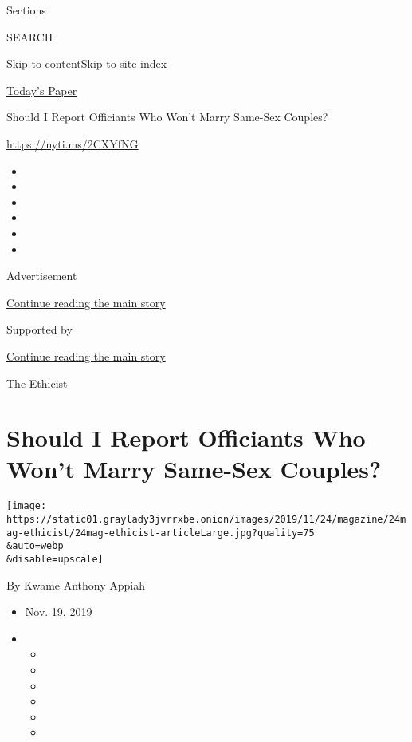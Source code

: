 Sections

SEARCH

\protect\hyperlink{site-content}{Skip to
content}\protect\hyperlink{site-index}{Skip to site index}

\href{https://myaccount.nytimes3xbfgragh.onion/auth/login?response_type=cookie\&client_id=vi}{}

\href{https://www.nytimes3xbfgragh.onion/section/todayspaper}{Today's
Paper}

Should I Report Officiants Who Won't Marry Same-Sex Couples?

\url{https://nyti.ms/2CXYfNG}

\begin{itemize}
\item
\item
\item
\item
\item
\item
\end{itemize}

Advertisement

\protect\hyperlink{after-top}{Continue reading the main story}

Supported by

\protect\hyperlink{after-sponsor}{Continue reading the main story}

\href{/column/the-ethicist}{The Ethicist}

\hypertarget{should-i-report-officiants-who-wont-marry-same-sex-couples}{%
\section{Should I Report Officiants Who Won't Marry Same-Sex
Couples?}\label{should-i-report-officiants-who-wont-marry-same-sex-couples}}

\texttt{[image: https://static01.graylady3jvrrxbe.onion/images/2019/11/24/magazine/24mag-ethicist/24mag-ethicist-articleLarge.jpg?quality=75\\\&auto=webp\\\&disable=upscale]}

By Kwame Anthony Appiah

\begin{itemize}
\item
  Nov. 19, 2019
\item
  \begin{itemize}
  \item
  \item
  \item
  \item
  \item
  \item
  \end{itemize}
\end{itemize}

